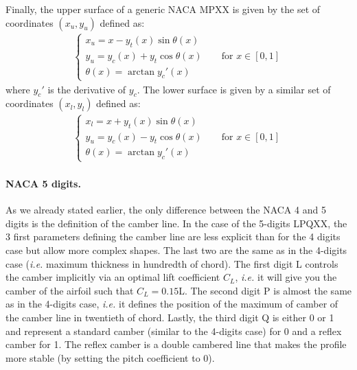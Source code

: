 \begin{subappendices}
	Finally, the upper surface of a generic \acrshort{NACA} MPXX is given by the set of coordinates $(x_u, y_u)$ defined as:
	\begin{align}
		\begin{cases}
			x_u = x - y_t(x)\sin\theta(x) \\
			y_u = y_c(x) + y_t\cos\theta(x) \qquad \textrm{for } x\in [0,1]\\
			\theta(x) = \arctan y_c'(x)
		\end{cases}
	\end{align}
	where $y_c'$ is the derivative of $y_c$. The lower surface is given by a similar set of coordinates $(x_l, y_l)$ defined as:
	\begin{align}
		\begin{cases}
			x_l = x + y_t(x)\sin\theta(x) \\
			y_u = y_c(x) - y_t\cos\theta(x) \qquad \textrm{for } x\in [0,1]\\
			\theta(x) = \arctan y_c'(x)
		\end{cases}
	\end{align}
	
	\paragraph{NACA 5 digits.} As we already stated earlier, the only difference between the \acrshort{NACA} 4 and 5 digits is the definition of the camber line. In the case of the 5-digits LPQXX, the 3 first parameters defining the camber line are less explicit than for the 4 digits case but allow more complex shapes. The last two are the same as in the 4-digits case (\emph{i.e.} maximum thickness in hundredth of chord). The first digit L controls the camber implicitly via an optimal lift coefficient $C_L$, \emph{i.e.} it will give you the camber of the airfoil such that $C_L = 0.15$L. The second digit P is almost the same as in the 4-digits case, \emph{i.e.} it defines the position of the maximum of camber of the camber line in twentieth of chord. Lastly, the third digit Q is either 0 or 1 and represent a standard camber (similar to the 4-digits case) for 0 and a reflex camber for 1. The reflex camber is a double cambered line that makes the profile more stable (by setting the pitch coefficient to 0).
	

\end{subappendices}
